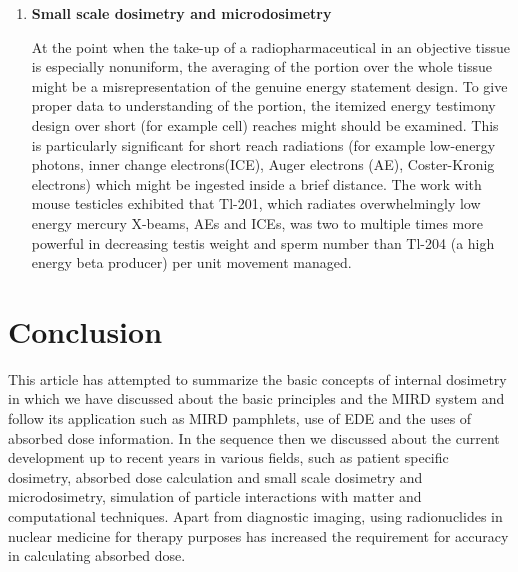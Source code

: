 \documentclass[12pt]{article}
\begin{document}
\begin{enumerate}
\item \textbf{ Small scale dosimetry and microdosimetry} \par At the point when the take-up of a radiopharmaceutical in an objective tissue is especially nonuniform, the averaging of the portion over the whole tissue might be a misrepresentation of the genuine energy statement design. To give proper data to understanding of the portion, the itemized energy testimony design over short (for example cell) reaches might should be examined. This is particularly significant for short reach radiations (for example low-energy photons, inner change electrons(ICE), Auger electrons (AE), Coster-Kronig electrons) which might be ingested inside a brief distance. The work with mouse testicles exhibited that Tl-201, which radiates overwhelmingly low energy mercury X-beams, AEs and ICEs, was two to multiple times more powerful in decreasing testis weight and sperm number than Tl-204 (a high energy beta producer) per unit movement managed.

\end{enumerate}

\section{Conclusion}
This article has attempted to summarize the basic
concepts of internal dosimetry in which we have discussed about the basic principles and the MIRD system and follow its application such as MIRD pamphlets, use of EDE and the uses of absorbed dose information. In the sequence then we discussed about the current development up to recent years in various fields, such as patient specific dosimetry, absorbed dose calculation and small scale dosimetry and microdosimetry, simulation of particle interactions with matter and computational techniques. Apart from diagnostic imaging, using radionuclides in nuclear medicine for therapy purposes has increased the requirement for accuracy in calculating absorbed dose. 
\end{document}
